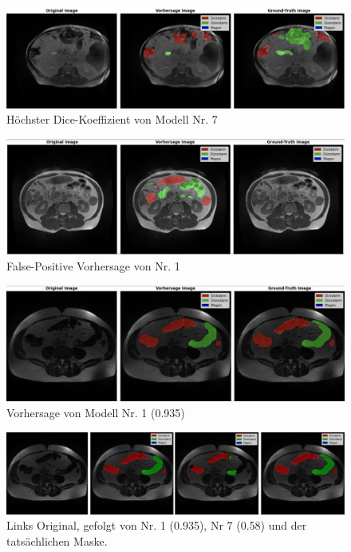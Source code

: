 \begin{figure}[H]
	\begin{center}
		\includegraphics[width=400pt]{LaTex/bilder/case88_day0_slice_0119_no7.png}
		\caption{ Höchster Dice-Koeffizient von Modell Nr. 7 }\label{Fig:case88_day0_slice_0119}
	\end{center}
\end{figure}


\begin{figure}[H]
	\begin{center}
		\includegraphics[width=400pt]{LaTex/bilder/case34_day16_slice_0072_no1.png}
		\caption{ False-Positive Vorhersage von Nr. 1 }\label{Fig:case34_day16_slice_0072}
	\end{center}
\end{figure}

\begin{figure}[H]
	\begin{center}
		\includegraphics[width=400pt]{LaTex/bilder/case40_day17_slice_0122_no1.png}
		\caption{ Vorhersage von Modell Nr. 1 (0.935) }\label{Fig:case40_day17_slice_0122}
	\end{center}
\end{figure}

\begin{figure}[H]
	\begin{center}
		\includegraphics[width=400pt]{LaTex/bilder/case40_day17_slice122_7vs1.png}
		\caption{Links Original, gefolgt von Nr. 1 (0.935), Nr 7 (0.58) und der tatsächlichen Maske. }\label{Fig:case40_day17_slice121}
	\end{center}
\end{figure}